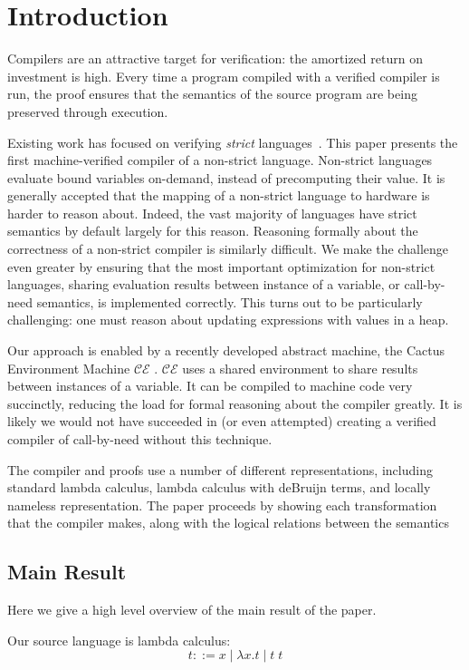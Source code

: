 \section{Introduction}
Compilers are an attractive target for verification: the amortized return on
investment is high. Every time a program compiled with a verified compiler is
run, the proof ensures that the semantics of the source program are being
preserved through execution. 

Existing work has focused on verifying \emph{strict}
languages~\cite{chlipala2007certified, leroy2012compcert}. This paper presents
the first machine-verified compiler of a non-strict language. Non-strict languages evaluate bound variables on-demand, instead of precomputing their
value. It is generally accepted that the mapping of a non-strict language to
hardware is harder to reason about.  Indeed, the vast majority of languages
have strict semantics by default largely for this reason. Reasoning formally
about the correctness of a non-strict compiler is similarly difficult. We make
the challenge even greater by ensuring that the most important optimization for
non-strict languages, sharing evaluation results between instance of a
variable, or call-by-need semantics, is implemented correctly. This turns out
to be particularly challenging: one must reason about updating expressions with
values in a heap. 

Our approach is enabled by a recently developed abstract machine, the Cactus
Environment Machine $\mathcal{CE}$ \cite{?}. $\mathcal{CE}$ uses a shared
environment to share results between instances of a variable. It can be compiled
to machine code very succinctly, reducing the load for formal reasoning about
the compiler greatly. It is likely we would not have succeeded in (or even
attempted) creating a verified compiler of call-by-need without this technique.

The compiler and proofs use a number of different representations, including
standard lambda calculus, lambda calculus with deBruijn terms, and locally
nameless representation. The paper proceeds by showing each transformation that
the compiler makes, along with the logical relations between the semantics

\subsection{Main Result}
Here we give a high level overview of the main result of the paper.

Our source language is lambda calculus: 
$$ t ::= x \; | \; \lambda x.t \; | \; t \; t $$

